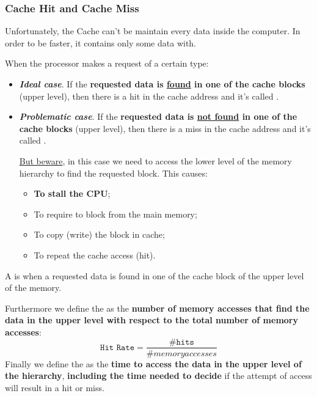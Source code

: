 \subsubsection{Cache Hit and Cache Miss}

Unfortunately, the Cache can't be maintain every data inside the computer. In order to be faster, it contains only some data with.

\highspace
When the processor makes a request of a certain type:
\begin{itemize}
    \item \textcolor{Green3}{\textbf{\emph{Ideal case}}}. If the \textbf{requested data is \underline{found} in one of the cache blocks} (upper level), then there is a hit in the cache address and it's called .

    \item \textcolor{Red2}{\textbf{\emph{Problematic case}}}. If the \textbf{requested data is \underline{not found} in one of the cache blocks} (upper level), then there is a miss in the cache address and it's called .

    \underline{But beware}, in this case we need to access the lower level of the memory hierarchy to find the requested block. This causes:
    \begin{itemize}
        \item \textbf{To stall the CPU};
        \item To require to block from the main memory;
        \item To copy (write) the block in cache;
        \item To repeat the cache access (hit).
    \end{itemize}
\end{itemize}

\begin{definitionbox}
    A  is when a requested data is found in one of the cache block of the upper level of the memory.
\end{definitionbox}

\noindent
Furthermore we define the  as the \textbf{number of memory accesses that find the data in the upper level with respect to the total number of memory accesses}:
\begin{equation*}
    \texttt{Hit Rate} = \dfrac{\texttt{\# hits}}{\# memory accesses}
\end{equation*}
Finally we define the  as the \textbf{time to access the data in the upper level of the hierarchy}, \textbf{including the time needed to decide} if the attempt of access will result in a hit or miss.


